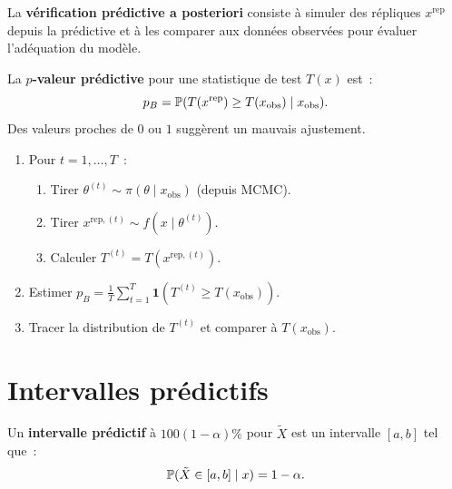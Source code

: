 \begin{definition}
La \textbf{v\'erification pr\'edictive a posteriori} consiste \`a
simuler des r\'epliques $x^{\text{rep}}$ depuis la pr\'edictive et \`a
les comparer aux donn\'ees observ\'ees pour \'evaluer l'ad\'equation du
mod\`ele.
\end{definition}

\begin{definition}
La \textbf{$p$-valeur pr\'edictive} pour une statistique de test
$T(x)$ est~:
\[
  p_B = \mathbb{P}(T(x^{\text{rep}}) \geq T(x_{\text{obs}}) \mid x_{\text{obs}}).
\]
Des valeurs proches de $0$ ou $1$ sugg\`erent un mauvais ajustement.
\end{definition}

\begin{algorithme}[title=\textbf{V\'erification pr\'edictive a posteriori}]
\begin{enumerate}
  \item Pour $t = 1, \ldots, T$~:
  \begin{enumerate}
    \item Tirer $\theta^{(t)} \sim \pi(\theta \mid x_{\text{obs}})$ (depuis MCMC).
    \item Tirer $x^{\text{rep},(t)} \sim f(x \mid \theta^{(t)})$.
    \item Calculer $T^{(t)} = T(x^{\text{rep},(t)})$.
  \end{enumerate}
  \item Estimer $p_B = \frac{1}{T}\sum_{t=1}^T \mathbf{1}(T^{(t)} \geq T(x_{\text{obs}}))$.
  \item Tracer la distribution de $T^{(t)}$ et comparer \`a $T(x_{\text{obs}})$.
\end{enumerate}
\end{algorithme}

\section{Intervalles pr\'edictifs}

\begin{definition}
Un \textbf{intervalle pr\'edictif} \`a $100(1-\alpha)\%$ pour $\tilde{X}$ est
un intervalle $[a, b]$ tel que~:
\[
  \mathbb{P}(\tilde{X} \in [a, b] \mid x) = 1 - \alpha.
\]
\end{definition}

